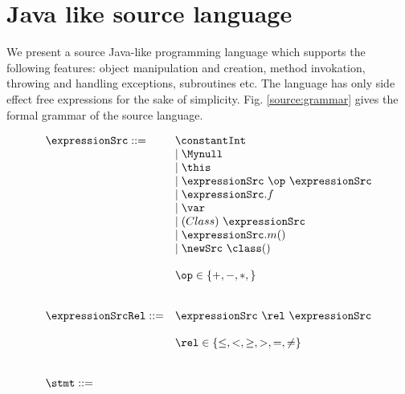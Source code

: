 
\newtheorem{Expression}{Definition}[section]
\newtheorem{ExpressionRel}[Expression]{Definition}
\newtheorem{Statement}[Expression]{Definition}

\section{Java like source language} \label{source}


We present a source Java-like programming language which supports the following features:
object manipulation and creation, method invokation, throwing and handling exceptions, subroutines etc. 
The language has only side effect free expressions for the sake of simplicity.
 Fig. \ref{source:grammar} gives the formal grammar of the source language.
\begin{figure}[ht!] 
\begin{frameit}
   $$ \begin{array} {ll}    
     \expressionSrc ::=         & \constantInt  \\
				& \mid \Mynull  \\
				& \mid \this \\
				& \mid \expressionSrc \ \op \ \expressionSrc \\  
				& \mid \expressionSrc.f \\
				& \mid \var \\
  			        & \mid (Class) \ \expressionSrc \\
				& \mid \expressionSrc.m() \\
				& \mid  \newSrc \ \class  ( ) \\
				& \\
				&  \op \in \{ +, - , *, \}  \\
                                & \\
				& \\
     \expressionSrcRel ::=      & \expressionSrc \ \rel \ \expressionSrc \\
				& \\   
				& \rel \in \{ \le, < ,  \ge, >, = , \neq \}      \\
				& \\
				& \\
      \stmt ::=		        %

\end{array}$$
\end{frameit}
\end{figure}

